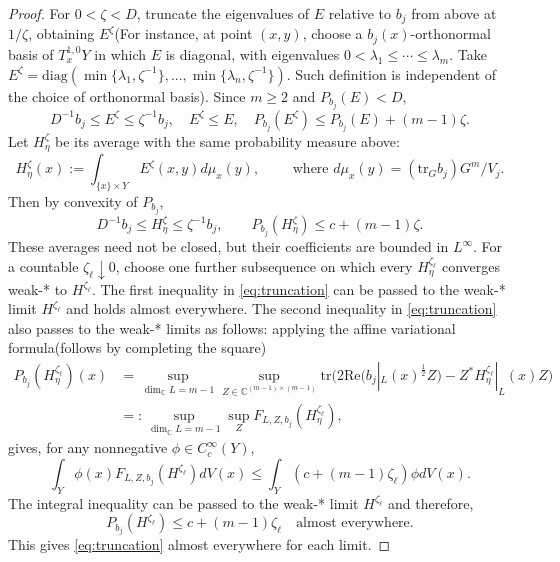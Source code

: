 \documentclass[reqno]{amsart}
\theoremstyle{remark}
\def\tr{\text{tr}}
\theoremstyle{plain}
\begin{document}
\begin{proof}
For \(0<\zeta<D\), truncate the eigenvalues of \(E\) relative to  \(b_j\) from above at \(1/\zeta\), obtaining \(E^\zeta\)(For instance, at point $(x,y)$, choose a $b_j(x)$-orthonormal basis of $T^{1,0}_xY$ in which $E$ is diagonal, with eigenvalues $0<\lambda_1\le\cdots\le\lambda_m$. Take $E^\zeta=\text{diag}(\min\{\lambda_1,\zeta^{-1}\},...,\min\{\lambda_n,\zeta^{-1}\})$. Such definition is independent of the choice of orthonormal basis). Since \(m\ge2\) and \(P_{b_j}(E)<D\),
\[
D^{-1}b_j\le E^\zeta\le\zeta^{-1}b_j,\quad E^\zeta\le E,\quad
P_{b_j}(E^\zeta)\le P_{b_j}(E)+(m-1)\zeta.
\]
Let \(H_\eta^\zeta\) be its average with the same probability measure above:\[
H_\eta^\zeta(x):=\int_{\{x\}\times Y}E^\zeta(x,y)d\mu_x(y), \qquad \text{ where }d\mu_x(y)=(\tr_Gb_j)G^m/V_j.
\]
Then by convexity of $P_{b_j}$,
\begin{equation}\label{eq:truncation}
D^{-1}b_j\le H_\eta^\zeta\le\zeta^{-1}b_j,\qquad
P_{b_j}(H_\eta^\zeta)\le c+(m-1)\zeta.
\end{equation}
These averages need not be closed, but their coefficients are bounded in \(L^\infty\). For a countable \(\zeta_\ell\downarrow0\), choose one further subsequence on which every \(H_\eta^{\zeta_\ell}\) converges weak-* to \(H^{\zeta_\ell}\). The first inequality in \eqref{eq:truncation} can be passed to the weak-* limit $H^{\zeta_\ell}$ and holds almost everywhere. The second inequality in \eqref{eq:truncation} also passes to the weak-* limits as follows: applying the affine variational formula(follows by completing the square)
\[\begin{aligned}
P_{b_j}(H_\eta^{\zeta_\ell})(x)&=\sup_{\dim_\mathbb{C} L=m-1}\sup_{Z\in \mathbb{C}^{(m-1)\times(m-1)}}\tr\bigl(2\text{Re}(b_j|_L(x)^\frac12Z)-Z^*H_{\eta}^{\zeta_\ell}|_L(x)Z\bigr)\\
&=:\sup_{\dim_\mathbb{C} L=m-1}\sup_ZF_{L,Z,b_j}(H_\eta^{\zeta_\ell}),   
\end{aligned}
\]
gives, for any nonnegative $\phi\in C^\infty_c(Y)$, \[
\int_Y\phi(x)F_{L,Z,b_j}(H^{\zeta_\ell})dV(x)\leq \int_Y(c+(m-1)\zeta_\ell)\phi dV(x).
\]
The integral inequality can be passed to the weak-* limit $H^{\zeta_\ell}$ and therefore, \[
P_{b_j}(H^{\zeta_\ell})\leq c+(m-1)\zeta_\ell
\quad \text{almost everywhere.}\]
This gives \eqref{eq:truncation} almost everywhere for each limit.


\end{proof}
\end{document}

